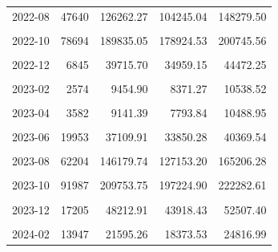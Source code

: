 \begin{longtable}[t]{crrrr}
2022-08 & 47640 & 126262.27 & 104245.04 & 148279.50\\
\cellcolor{gray!10}{2022-09} & \cellcolor{gray!10}{159128} & \cellcolor{gray!10}{297851.11} & \cellcolor{gray!10}{276868.69} & \cellcolor{gray!10}{318833.54}\\
2022-10 & 78694 & 189835.05 & 178924.53 & 200745.56\\
\cellcolor{gray!10}{2022-11} & \cellcolor{gray!10}{26949} & \cellcolor{gray!10}{82579.70} & \cellcolor{gray!10}{74949.68} & \cellcolor{gray!10}{90209.72}\\
2022-12 & 6845 & 39715.70 & 34959.15 & 44472.25\\
\cellcolor{gray!10}{2023-01} & \cellcolor{gray!10}{3026} & \cellcolor{gray!10}{14851.73} & \cellcolor{gray!10}{12194.82} & \cellcolor{gray!10}{17508.65}\\
2023-02 & 2574 & 9454.90 & 8371.27 & 10538.52\\
\cellcolor{gray!10}{2023-03} & \cellcolor{gray!10}{3623} & \cellcolor{gray!10}{9804.67} & \cellcolor{gray!10}{8409.98} & \cellcolor{gray!10}{11199.37}\\
2023-04 & 3582 & 9141.39 & 7793.84 & 10488.95\\
\cellcolor{gray!10}{2023-05} & \cellcolor{gray!10}{10992} & \cellcolor{gray!10}{21679.67} & \cellcolor{gray!10}{19471.63} & \cellcolor{gray!10}{23887.72}\\
2023-06 & 19953 & 37109.91 & 33850.28 & 40369.54\\
\cellcolor{gray!10}{2023-07} & \cellcolor{gray!10}{23230} & \cellcolor{gray!10}{60990.58} & \cellcolor{gray!10}{57418.29} & \cellcolor{gray!10}{64562.87}\\
2023-08 & 62204 & 146179.74 & 127153.20 & 165206.28\\
\cellcolor{gray!10}{2023-09} & \cellcolor{gray!10}{88659} & \cellcolor{gray!10}{226021.18} & \cellcolor{gray!10}{202165.61} & \cellcolor{gray!10}{249876.76}\\
2023-10 & 91987 & 209753.75 & 197224.90 & 222282.61\\
\cellcolor{gray!10}{2023-11} & \cellcolor{gray!10}{74850} & \cellcolor{gray!10}{137657.54} & \cellcolor{gray!10}{120491.06} & \cellcolor{gray!10}{154824.02}\\
2023-12 & 17205 & 48212.91 & 43918.43 & 52507.40\\
\cellcolor{gray!10}{2024-01} & \cellcolor{gray!10}{8196} & \cellcolor{gray!10}{20146.88} & \cellcolor{gray!10}{17423.91} & \cellcolor{gray!10}{22869.86}\\
2024-02 & 13947 & 21595.26 & 18373.53 & 24816.99\\

\end{longtable}

